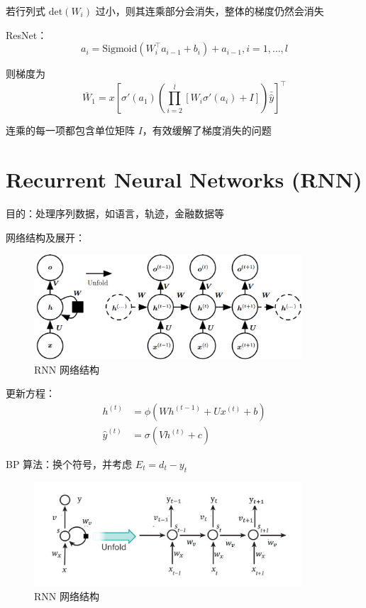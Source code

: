\documentclass[openany]{ctexbook}
\theoremstyle{kaiti}
\theoremstyle{normal}
\begin{document}
若行列式 $\mathrm{det}(W_i)$ 过小，则其连乘部分会消失，整体的梯度仍然会消失

ResNet：
\begin{equation}
a_i=\mathrm{Sigmoid}\left(W_{i}^{\top}a_{i-1}+b_i \right)+a_{i-1},i=1,\dots ,l
\end{equation}

则梯度为
\begin{equation}
\bar{W}_1=x\left[\sigma '\left(a_1 \right)\left(\prod_{i=2}^{l}\left[ W_i\sigma '\left(a_i \right)+I \right] \right)\bar{\hat{y}} \right] ^{\top}
\end{equation}

连乘的每一项都包含单位矩阵 $I$，有效缓解了梯度消失的问题

\section{Recurrent Neural Networks (RNN)}

目的：处理序列数据，如语言，轨迹，金融数据等

网络结构及展开：

\begin{figure}
  \centering
  \includegraphics[width=10cm]{1627808597430-8.3.png}
  \caption{RNN 网络结构}
\end{figure}

更新方程：
\begin{equation}
\begin{aligned}
  h^{\left(t \right)}&=\phi \left(Wh^{\left(t-1 \right)}+Ux^{\left(t \right)}+b \right)\\ 
  \hat{y}^{\left(t \right)}&=\sigma \left(Vh^{\left(t \right)}+c \right)
\end{aligned}
\end{equation}

BP 算法：换个符号，并考虑 $E_t=d_t-y_t$

\begin{figure}
  \centering
  \includegraphics[width=10cm]{1627808617206-8.3-2.png}
  \caption{RNN 网络结构}
\end{figure}
\end{document}
